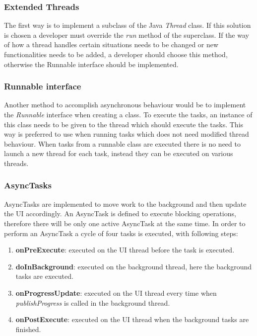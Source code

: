    \subsubsection{Extended Threads}
    The first way is to implement a subclass of the Java \emph{Thread} class. If this solution is chosen a developer must override the \emph{run} method of the superclass. If the way of how a thread handles certain situations needs to be changed or new functionalities needs to be added, a developer should choose this method, otherwise the Runnable interface should be implemented.

    \subsubsection{Runnable interface}
    Another method to accomplish asynchronous behaviour would be to implement the \emph{Runnable} interface when creating a class. To execute the tasks, an instance of this class needs to be given to the thread which should execute the tasks. This way is preferred to use when running tasks which does not need modified thread behaviour. When tasks from a runnable class are executed there is no need to launch a new thread for each task, instead they can be executed on various threads.

    \subsubsection{AsyncTasks}
    AsyncTasks are implemented to move work to the background and then update the UI accordingly. An AsyncTask is defined to execute blocking operations, therefore there will be only one active AsyncTask at the same time. In order to perform an AsyncTask a cycle of four tasks is executed, with following steps:

    \begin{enumerate}
        \item \textbf{onPreExecute}: executed on the UI thread before the task is executed.
        \item \textbf{doInBackground}: executed on the background thread, here the background tasks are executed.
        \item \textbf{onProgressUpdate}: executed on the UI thread every time when \emph{publishProgress} is called in the background thread.
        \item \textbf{onPostExecute}: executed on the UI thread when the background tasks are finished.
    \end{enumerate}

